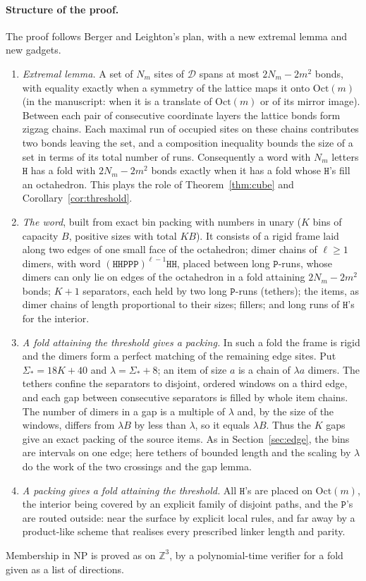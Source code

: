 \documentclass[11pt,letterpaper]{article}
\theoremstyle{definition}
\theoremstyle{remark}
\newcommand{\Hh}{\mathtt{H}}
\newcommand{\Pp}{\mathtt{P}}
\newcommand{\Z}{\mathbb{Z}}
\begin{document}
\paragraph{Structure of the proof.}
The proof follows Berger and Leighton's plan, with a new extremal lemma and new gadgets.
\begin{enumerate}[label=(\arabic*)]
  \item \emph{Extremal lemma.} A set of $N_m$ sites of $\mathcal D$ spans at most $2N_m-2m^2$ bonds,
    with equality exactly when a symmetry of the lattice maps it onto $\mathrm{Oct}(m)$ (in the
    manuscript: when it is a translate of $\mathrm{Oct}(m)$ or of its mirror image). Between each
    pair of consecutive coordinate layers the lattice bonds form zigzag chains. Each maximal run of
    occupied sites on these chains contributes two bonds leaving the set, and a composition
    inequality bounds the size of a set in terms of its total number of runs. Consequently a word with $N_m$ letters $\Hh$ has a fold with
    $2N_m-2m^2$ bonds exactly when it has a fold whose $\Hh$'s fill an octahedron. This plays the
    role of Theorem~\ref{thm:cube} and Corollary~\ref{cor:threshold}.
  \item \emph{The word}, built from exact bin packing with numbers in unary ($K$ bins of capacity
    $B$, positive sizes with total $KB$). It consists of a rigid frame laid along two edges of one
    small face of the octahedron; dimer chains of $\ell\ge1$ dimers, with word
    $(\Hh\Hh\Pp\Pp\Pp)^{\ell-1}\Hh\Hh$, placed between long $\Pp$-runs, whose dimers can only lie on
    edges of the octahedron in a fold attaining $2N_m-2m^2$ bonds; $K+1$ separators, each held by
    two long $\Pp$-runs (tethers); the items, as dimer chains of length proportional to their sizes;
    fillers; and long runs of $\Hh$'s for the interior.
  \item \emph{A fold attaining the threshold gives a packing.} In such a fold the frame is rigid
    and the dimers form a perfect matching of the remaining edge sites. Put $\Sigma_*=18K+40$ and
    $\lambda=\Sigma_*+8$; an item of size $a$ is a chain of $\lambda a$ dimers. The tethers confine
    the separators to disjoint, ordered windows on a third edge, and each gap between consecutive
    separators is filled by whole item chains. The number of dimers in a gap is a multiple of
    $\lambda$ and, by the size of the windows, differs from $\lambda B$ by less than $\lambda$, so
    it equals $\lambda B$. Thus the $K$ gaps give an exact packing of the source items. As in
    Section~\ref{sec:edge}, the bins are intervals on one edge; here tethers of bounded length and
    the scaling by $\lambda$ do the work of the two crossings and the gap lemma.
  \item \emph{A packing gives a fold attaining the threshold.} All $\Hh$'s are placed on
    $\mathrm{Oct}(m)$, the interior being covered by an explicit family of disjoint paths, and the
    $\Pp$'s are routed outside: near the surface by explicit local rules, and far away by a
    product-like scheme that realises every prescribed linker length and parity.
\end{enumerate}
Membership in NP is proved as on $\Z^3$, by a polynomial-time verifier for a fold given as a list of
directions.
\end{document}
